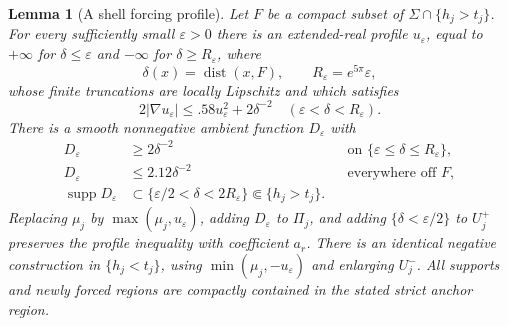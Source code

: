 \documentclass[11pt]{article}
\numberwithin{equation}{section}
\newtheorem{lemma}[theorem]{Lemma}
\theoremstyle{definition}
\theoremstyle{remark}
\begin{document}
\begin{lemma}[A shell forcing profile]\label{local:shell}
Let $F$ be a compact subset of $\Sigma\cap\{h_j>t_j\}$.
For every sufficiently small $\varepsilon>0$ there is an extended-real
profile $u_\varepsilon$, equal to $+\infty$ for $\delta\le\varepsilon$
and $-\infty$ for $\delta\ge R_\varepsilon$, where
\[
 \delta(x)=\operatorname{dist}(x,F),\qquad R_\varepsilon=e^{5\pi}\varepsilon,
\]
whose finite truncations are locally Lipschitz and which satisfies
\begin{equation}\label{local:shell-gradient}
 2|\nabla u_\varepsilon|
       \le .58u_\varepsilon^2+2\delta^{-2}
       \quad (\varepsilon<\delta<R_\varepsilon).
\end{equation}
There is a smooth nonnegative ambient function $D_\varepsilon$ with
\begin{equation}\label{local:shell-potential}
 \begin{aligned}
 D_\varepsilon&\ge2\delta^{-2}
       &&\text{on }\{\varepsilon\le\delta\le R_\varepsilon\},\\
 D_\varepsilon&\le2.12\delta^{-2}
       &&\text{everywhere off }F,\\
 \operatorname{supp} D_\varepsilon&\subset
       \{\varepsilon/2<\delta<2R_\varepsilon\}
       \Subset\{h_j>t_j\}.
 \end{aligned}
\end{equation}
Replacing $\mu_j$ by $\max(\mu_j,u_\varepsilon)$, adding
$D_\varepsilon$ to $\Pi_j$, and adding
$\{\delta<\varepsilon/2\}$ to $U_j^+$ preserves the profile inequality
with coefficient $a_r$.  There is an identical negative construction
in $\{h_j<t_j\}$, using $\min(\mu_j,-u_\varepsilon)$ and enlarging
$U_j^-$.  All supports and newly forced regions are compactly
contained in the stated strict anchor region.
\end{lemma}
\end{document}

